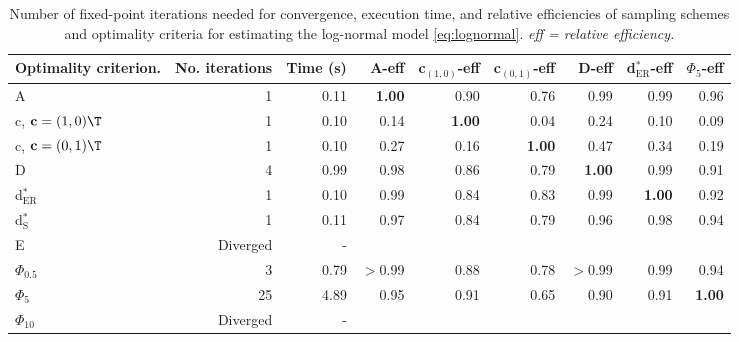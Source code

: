 \begin{table}[htb!]
\centering
\caption{Number of fixed-point iterations needed for convergence, execution time, and relative efficiencies of sampling schemes and optimality criteria for estimating the log-normal model \eqref{eq:lognormal}. \textit{eff = relative efficiency.}} 
\label{tab:baseline_impact_speed}
\begin{tabular}{lrrrrrrrr}
 Optimality criterion. & No. iterations & Time (s) & A-eff & c$_{(1,0)}$-eff & c$_{(0,1)}$-eff & D-eff & d$^*_{\mathrm{ER}}$-eff & $\Phi_5$-eff \\ 
  \hline
A & 1 & 0.11 & \textbf{1.00} & 0.90 & 0.76 & 0.99 & 0.99 & 0.96 \\ 
  c, $\mathbf{c} = (1,0)\T$ & 1 & 0.10 & 0.14 & \textbf{1.00} & 0.04 & 0.24 & 0.10 & 0.09 \\ 
  c, $\mathbf{c} = (0,1)\T$ & 1 & 0.10 & 0.27 & 0.16 & \textbf{1.00} & 0.47 & 0.34 & 0.19 \\ 
  D & 4 & 0.99 & 0.98 & 0.86 & 0.79 & \textbf{1.00} & 0.99 & 0.91 \\ 
  d$^*_{\mathrm{ER}}$ & 1 & 0.10 & 0.99 & 0.84 & 0.83 & 0.99 & \textbf{1.00} & 0.92 \\ 
  d$^*_{\mathrm{S}}$ & 1 & 0.11 & 0.97 & 0.84 & 0.79 & 0.96 & 0.98 & 0.94 \\ 
  E & Diverged & - &  &  &  &  &  &  \\ 
  $\Phi_{0.5}$ & 3 & 0.79 & $>$0.99 & 0.88 & 0.78 & $>$0.99 & 0.99 & 0.94 \\ 
  $\Phi_5$ & 25 & 4.89 & 0.95 & 0.91 & 0.65 & 0.90 & 0.91 & \textbf{1.00} \\ 
  $\Phi_{10}$ & Diverged & - &  &  &  &  &  &  \\ 
   \hline
\end{tabular}
\end{table}

